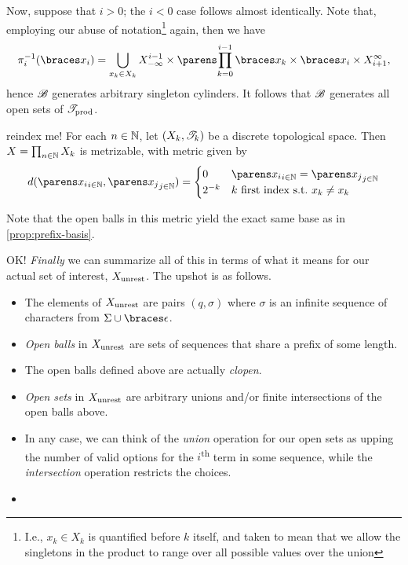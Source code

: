 \documentclass{fkpaper}
\begin{document}
\begin{multicols}{2}
\begin{sproof}
  Now, suppose that $i > 0$; the $i < 0$ case follows almost
  identically. Note that, employing our abuse of
  notation\footnote{I.e., $x_k \in X_k$ is quantified before $k$
    itself, and taken to mean that we allow the singletons in the
    product to range over all possible values over the union} again,
  then we have
  \[
    \pi_{i}^{-1}(\set{x_i}) = \bigcup_{x_k \in X_k} X_{-\infty}^{i -
      1} \times \pn{\prod_{k=0}^{i-1} \set{x_k}} \times \set{x_i}
    \times X_{i+1}^{\infty},
  \]
  hence ${\mathscr{B}}$ generates arbitrary singleton cylinders. It follows
  that ${\mathscr{B}}$ generates all open sets of ${\mathscr{T}}_{\rm prod}$.
\end{sproof}



\begin{proposition}\label{prop:product-metrizable} {\color{blue}
    reindex me!}
  For each $n \in \mathbb{N}$, let $(X_k, {\mathscr{T}}_k)$ be a discrete topological
  space. Then $X = \prod_{n\in\mathbb{N}} X_k$ is metrizable, with metric
  given by
  \[
    d(\pn{x_i}_{i \in \NN}, \pn{x_j}_{j \in \NN}) =
    \begin{cases}
      0 & \pn{x_i}_{i \in \NN} = \pn{x_j}_{j \in \NN} \\
      2^{-k} & k \textnormal{ first index s.t.\ } x_k \neq x_k
    \end{cases}
  \]
\end{proposition}
\begin{sproof}
  Note that the open balls in this metric yield the exact same base as
  in \cref{prop:prefix-basis}.
\end{sproof}

OK! \emph{Finally} we can summarize all of this in terms of what it
means for our actual set of interest, $X_{\rm unrest}$. The upshot is
as follows.
\begin{itemize}
  \item The elements of $X_{\rm unrest}$ are pairs $(q, \sigma)$ where
    $\sigma$ is an infinite sequence of characters from $\Sigma \cup
    \set{\epsilon}$.
  \item \emph{Open balls} in $X_{\rm unrest}$ are sets of sequences
    that share a prefix of some length.
  \item The open balls defined above are actually \emph{clopen}.
  \item \emph{Open sets} in $X_{\rm unrest}$ are arbitrary unions
    and/or finite intersections of the open balls above.
  \item In any case, we can think of the \emph{union} operation for
    our open sets as upping the number of valid options for the
    $i$\textsuperscript{th} term in some sequence, while the
    \emph{intersection} operation restricts the choices.
  \item
\end{itemize}



\end{multicols}
\end{document}
